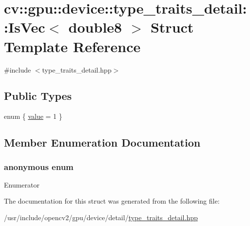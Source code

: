 \hypertarget{structcv_1_1gpu_1_1device_1_1type__traits__detail_1_1IsVec_3_01double8_01_4}{\section{cv\-:\-:gpu\-:\-:device\-:\-:type\-\_\-traits\-\_\-detail\-:\-:Is\-Vec$<$ double8 $>$ Struct Template Reference}
\label{structcv_1_1gpu_1_1device_1_1type__traits__detail_1_1IsVec_3_01double8_01_4}
}


{\ttfamily \#include $<$type\-\_\-traits\-\_\-detail.\-hpp$>$}

\subsection*{Public Types}
\begin{DoxyCompactItemize}
\item 
enum \{ \hyperlink{structcv_1_1gpu_1_1device_1_1type__traits__detail_1_1IsVec_3_01double8_01_4_af726c5b1fdf65d4ed0a97f54f6162039aae2f325e9403789f795edcf41f9be490}{value} = 1
 \}
\end{DoxyCompactItemize}


\subsection{Member Enumeration Documentation}
\hypertarget{structcv_1_1gpu_1_1device_1_1type__traits__detail_1_1IsVec_3_01double8_01_4_af726c5b1fdf65d4ed0a97f54f6162039}{\subsubsection[{anonymous enum}]{\setlength{\rightskip}{0pt plus 5cm}anonymous enum}}\label{structcv_1_1gpu_1_1device_1_1type__traits__detail_1_1IsVec_3_01double8_01_4_af726c5b1fdf65d4ed0a97f54f6162039}
\begin{Desc}
\item[Enumerator]\par
\begin{description}
\item[{\em 
\hypertarget{structcv_1_1gpu_1_1device_1_1type__traits__detail_1_1IsVec_3_01double8_01_4_af726c5b1fdf65d4ed0a97f54f6162039aae2f325e9403789f795edcf41f9be490}{value}\label{structcv_1_1gpu_1_1device_1_1type__traits__detail_1_1IsVec_3_01double8_01_4_af726c5b1fdf65d4ed0a97f54f6162039aae2f325e9403789f795edcf41f9be490}
}]\end{description}
\end{Desc}


The documentation for this struct was generated from the following file\-:\begin{DoxyCompactItemize}
\item 
/usr/include/opencv2/gpu/device/detail/\hyperlink{type__traits__detail_8hpp}{type\-\_\-traits\-\_\-detail.\-hpp}\end{DoxyCompactItemize}
